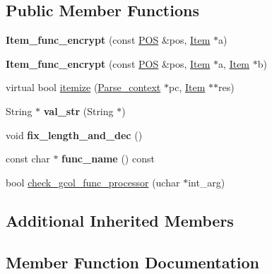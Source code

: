 \subsection*{Public Member Functions}
\begin{DoxyCompactItemize}
\item 
\mbox{\label{classItem__func__encrypt_a46319aa499e1692ded2c671152080519}} 
{\bfseries Item\+\_\+func\+\_\+encrypt} (const \mbox{\hyperlink{structYYLTYPE}{P\+OS}} \&pos, \mbox{\hyperlink{classItem}{Item}} $\ast$a)
\item 
\mbox{\label{classItem__func__encrypt_ad5abbd09b508c1eb0af40263a503ad1e}} 
{\bfseries Item\+\_\+func\+\_\+encrypt} (const \mbox{\hyperlink{structYYLTYPE}{P\+OS}} \&pos, \mbox{\hyperlink{classItem}{Item}} $\ast$a, \mbox{\hyperlink{classItem}{Item}} $\ast$b)
\item 
virtual bool \mbox{\hyperlink{classItem__func__encrypt_acea55a9904c3859cf69425dddf16a121}{itemize}} (\mbox{\hyperlink{structParse__context}{Parse\+\_\+context}} $\ast$pc, \mbox{\hyperlink{classItem}{Item}} $\ast$$\ast$res)
\item 
\mbox{\label{classItem__func__encrypt_a99b69437c2cabe916adb95ee6ff69631}} 
String $\ast$ {\bfseries val\+\_\+str} (String $\ast$)
\item 
\mbox{\label{classItem__func__encrypt_a726577969ac468743b6f88e23ae84219}} 
void {\bfseries fix\+\_\+length\+\_\+and\+\_\+dec} ()
\item 
\mbox{\label{classItem__func__encrypt_a3e86183a7046682c88ae1322b9901701}} 
const char $\ast$ {\bfseries func\+\_\+name} () const
\item 
bool \mbox{\hyperlink{classItem__func__encrypt_a8b948c531a8265980a7be6913f3fe36c}{check\+\_\+gcol\+\_\+func\+\_\+processor}} (uchar $\ast$int\+\_\+arg)
\end{DoxyCompactItemize}
\subsection*{Additional Inherited Members}


\subsection{Member Function Documentation}
\mbox{\label{classItem__func__encrypt_a8b948c531a8265980a7be6913f3fe36c}} 
